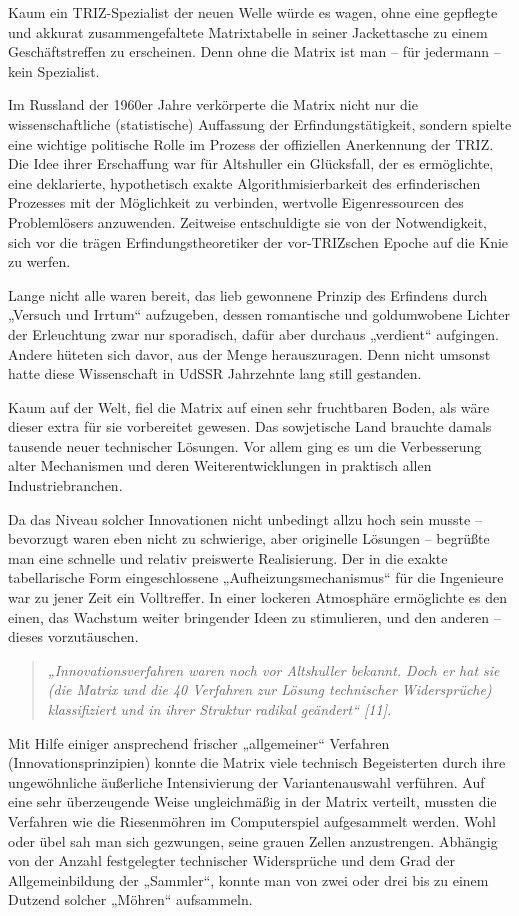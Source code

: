 \documentclass[11pt,a4paper]{article}
\begin{document}
Kaum ein TRIZ-Spezialist der neuen Welle würde es wagen, ohne eine gepflegte
und akkurat zusammengefaltete Matrixtabelle in seiner Jackettasche zu einem
Geschäftstreffen zu erscheinen. Denn ohne die Matrix ist man – für jedermann –
kein Spezialist.

Im Russland der 1960er Jahre verkörperte die Matrix nicht nur die
wissenschaftliche (statistische) Auffassung der Erfindungstätigkeit, sondern
spielte eine wichtige politische Rolle im Prozess der offiziellen Anerkennung
der TRIZ. Die Idee ihrer Erschaffung war für Altshuller ein Glücksfall, der es
ermöglichte, eine deklarierte, hypothetisch exakte Algorithmisierbarkeit des
erfinderischen Prozesses mit der Möglichkeit zu verbinden, wertvolle
Eigenressourcen des Problemlösers anzuwenden. Zeitweise entschuldigte sie von
der Notwendigkeit, sich vor die trägen Erfindungstheoretiker der vor-TRIZschen
Epoche auf die Knie zu werfen.

Lange nicht alle waren bereit, das lieb gewonnene Prinzip des Erfindens durch
„Versuch und Irrtum“ aufzugeben, dessen romantische und goldumwobene Lichter
der Erleuchtung zwar nur sporadisch, dafür aber durchaus „verdient“ aufgingen.
Andere hüteten sich davor, aus der Menge herauszuragen. Denn nicht umsonst
hatte diese Wissenschaft in UdSSR Jahrzehnte lang still gestanden.

Kaum auf der Welt, fiel die Matrix auf einen sehr fruchtbaren Boden, als wäre
dieser extra für sie vorbereitet gewesen. Das sowjetische Land brauchte damals
tausende neuer technischer Lösungen. Vor allem ging es um die Verbesserung
alter Mechanismen und deren Weiterentwicklungen in praktisch allen
Industriebranchen.

Da das Niveau solcher Innovationen nicht unbedingt allzu hoch sein musste –
bevorzugt waren eben nicht zu schwierige, aber originelle Lösungen – begrüßte
man eine schnelle und relativ preiswerte Realisierung. Der in die exakte
tabellarische Form eingeschlossene „Aufheizungsmechanismus“ für die Ingenieure
war zu jener Zeit ein Volltreffer. In einer lockeren Atmosphäre ermöglichte es
den einen, das Wachstum weiter bringender Ideen zu stimulieren, und den
anderen – dieses vorzutäuschen.
\begin{quote}\em
  „Innovationsverfahren waren noch vor Altshuller bekannt. Doch er hat sie
  (die Matrix und die 40 Verfahren zur Lösung technischer Widersprüche)
  klassifiziert und in ihrer Struktur radikal geändert“ [11].
\end{quote}
Mit Hilfe einiger ansprechend frischer „allgemeiner“ Verfahren
(Innovationsprinzipien) konnte die Matrix viele technisch Begeisterten durch
ihre ungewöhnliche äußerliche Intensivierung der Variantenauswahl verführen.
Auf eine sehr überzeugende Weise ungleichmäßig in der Matrix verteilt, mussten
die Verfahren wie die Riesenmöhren im Computerspiel aufgesammelt werden. Wohl
oder übel sah man sich gezwungen, seine grauen Zellen anzustrengen. Abhängig
von der Anzahl festgelegter technischer Widersprüche und dem Grad der
Allgemeinbildung der „Sammler“, konnte man von zwei oder drei bis zu einem
Dutzend solcher „Möhren“ aufsammeln.
\end{document}
